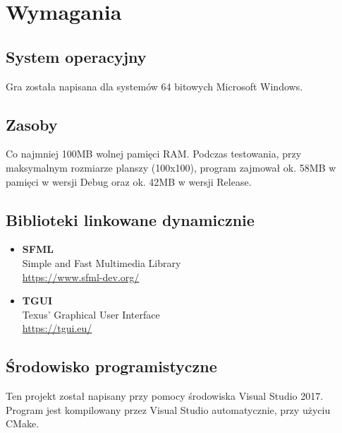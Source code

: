 \documentclass[12pt,a4paper]{article}
\begin{document}
\newpage

\section{Wymagania}
\subsection{System operacyjny}
Gra została napisana dla systemów 64 bitowych Microsoft Windows.

\subsection{Zasoby}
Co najmniej 100MB wolnej pamięci RAM. Podczas testowania, przy maksymalnym rozmiarze planszy (100x100), program zajmował ok. 58MB w pamięci w wersji Debug oraz ok. 42MB w wersji Release.

\subsection{Biblioteki linkowane dynamicznie}
\begin{itemize}
\item \Large \textbf{SFML}\\
Simple and Fast Multimedia Library\\
\url{https://www.sfml-dev.org/}
\item \Large \textbf{TGUI}\\
Texus' Graphical User Interface\\
\url{https://tgui.eu/}
\end{itemize}

\subsection{Środowisko programistyczne}
Ten projekt został napisany przy pomocy środowiska Visual Studio 2017.
Program jest kompilowany przez Visual Studio automatycznie, przy użyciu CMake.
\end{document}
